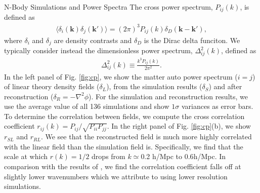 \begin{section}{N-Body Simulations and Power Spectra}
 The cross power spectrum, $P_{ij}(k)$, is defined as
 \begin{align}
   \langle \delta_i \left( \bm{k} \right) \delta_j \left( \bm{k'}\right) \rangle =
   \left( 2\pi \right) ^3 P_{ij} \left( k \right) \delta_D \left( \bm{k}-\bm{k'} \right),
 \end{align}
 where $\delta_{i}$ and $\delta_j$ are density contrasts and
 $\delta_D$ is the Dirac delta funciton. We typically consider instead
 the dimensionless power spectrum, $\Delta_{ij}^2(k)$, defined as
 \begin{align}
   \Delta_{ij}^2(k) \equiv \frac{k^3 P_{ij} \left( k \right)}{2\pi ^2}.
 \end{align}
 In the left panel of Fig. \ref{fig:cp}, we show the matter auto power spectrum
 ($i=j$) of linear theory density fields ($\delta_L$), from the
 simulation results ($\delta_S$) and after reconstruction
 ($\delta_R=-\nabla^2\phi$).  For the simulation and reconstruction
 results, we use the average value of all 136 simulations and show
 $1\sigma$ variances as error bars.  To determine the correlation
 between fields, we compute the cross correlation coefficient
 $r_{ij}(k) = P_{ij}/\sqrt{P_{ii}P_{jj}}$.  In the right panel of Fig. \ref{fig:cp}(b),
 we show $r_{SL}$ and $r_{RL}$.  We see that the reconstructed field
 is much more highly correlated with the linear field than the
 simulation field is.  Specifically, we find that the scale at which
 $r(k)=1/2$ drops from $k\simeq $0.2 h/Mpc to $0.6 $h/Mpc.  In
 comparison with the results of \citet{bib:ZhuH2016}, we find the
 correlation coefficient falls off at slightly lower wavenumbers which
 we attribute to using lower resolution simulations.


\end{section}

